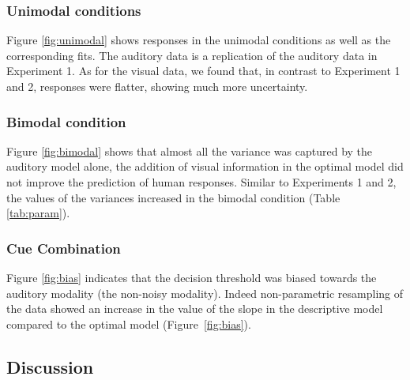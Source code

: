 \documentclass[english,,man,floatsintext]{apa6}
\theoremstyle{definition}
\theoremstyle{definition}
\theoremstyle{definition}
\theoremstyle{remark}
\begin{document}
\subsubsection{Unimodal conditions}\label{unimodal-conditions-2}

Figure \ref{fig:unimodal} shows responses in the unimodal conditions as
well as the corresponding fits. The auditory data is a replication of
the auditory data in Experiment 1. As for the visual data, we found
that, in contrast to Experiment 1 and 2, responses were flatter, showing
much more uncertainty.

\subsubsection{Bimodal condition}\label{bimodal-condition-3}

Figure \ref{fig:bimodal} shows that almost all the variance was captured
by the auditory model alone, the addition of visual information in the
optimal model did not improve the prediction of human responses. Similar
to Experiments 1 and 2, the values of the variances increased in the
bimodal condition (Table \ref{tab:param}).

\subsubsection{Cue Combination}\label{cue-combination-2}

Figure \ref{fig:bias} indicates that the decision threshold was biased
towards the auditory modality (the non-noisy modality). Indeed
non-parametric resampling of the data showed an increase in the value of
the slope in the descriptive model compared to the optimal model
(Figure~\ref{fig:bias}).

\subsection{Discussion}\label{discussion-2}
\end{document}
